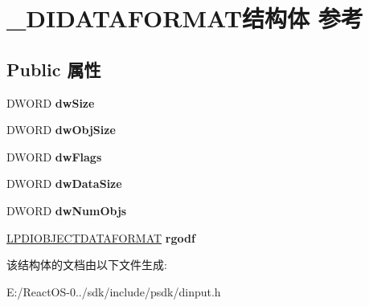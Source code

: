 \hypertarget{struct___d_i_d_a_t_a_f_o_r_m_a_t}{}\section{\+\_\+\+D\+I\+D\+A\+T\+A\+F\+O\+R\+M\+A\+T结构体 参考}
\label{struct___d_i_d_a_t_a_f_o_r_m_a_t}
\subsection*{Public 属性}
\begin{DoxyCompactItemize}
\item 
\mbox{\label{struct___d_i_d_a_t_a_f_o_r_m_a_t_a64bed8771b6a51a293167bfb51f098e6}} 
D\+W\+O\+RD {\bfseries dw\+Size}
\item 
\mbox{\label{struct___d_i_d_a_t_a_f_o_r_m_a_t_a8eb1112dae047866b7d5a1db30a00f47}} 
D\+W\+O\+RD {\bfseries dw\+Obj\+Size}
\item 
\mbox{\label{struct___d_i_d_a_t_a_f_o_r_m_a_t_a63ec17e89c54681dfae4dcf718c3271a}} 
D\+W\+O\+RD {\bfseries dw\+Flags}
\item 
\mbox{\label{struct___d_i_d_a_t_a_f_o_r_m_a_t_ac802a619ba5d5c3ed68c7588de5d6695}} 
D\+W\+O\+RD {\bfseries dw\+Data\+Size}
\item 
\mbox{\label{struct___d_i_d_a_t_a_f_o_r_m_a_t_ace482429434def2c8661611324d27abf}} 
D\+W\+O\+RD {\bfseries dw\+Num\+Objs}
\item 
\mbox{\label{struct___d_i_d_a_t_a_f_o_r_m_a_t_a184026e974a0d10632bd55e5fc2be20a}} 
\hyperlink{struct___d_i_o_b_j_e_c_t_d_a_t_a_f_o_r_m_a_t}{L\+P\+D\+I\+O\+B\+J\+E\+C\+T\+D\+A\+T\+A\+F\+O\+R\+M\+AT} {\bfseries rgodf}
\end{DoxyCompactItemize}


该结构体的文档由以下文件生成\+:\begin{DoxyCompactItemize}
\item 
E\+:/\+React\+O\+S-\/0../sdk/include/psdk/dinput.\+h\end{DoxyCompactItemize}
